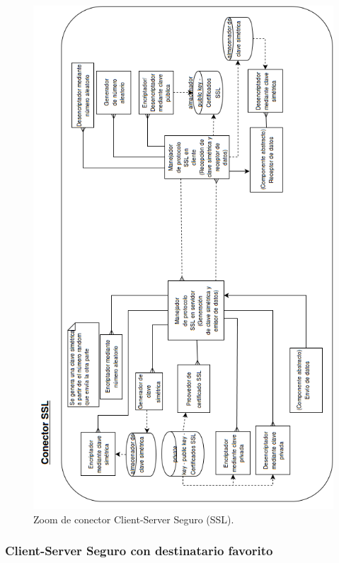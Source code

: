 \begin{figure}[H]
   \centering
   \includegraphics[height=0.95\textheight]{reentrega/imagenes/conector-ssl.png}
   \caption{Zoom de conector Client-Server Seguro (SSL).}
\end{figure}


\subsubsection{Client-Server Seguro con destinatario favorito}


